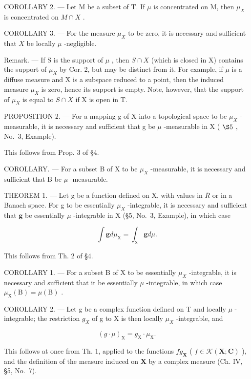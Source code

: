 COROLLARY 2. --- Let M be a subset of T. If \(\mu\) is concentrated on M, then \(\mu_{X}\) is concentrated on \(M \cap X\) .

COROLLARY 3. --- For the measure \(\mu_{X}\) to be zero, it is necessary and sufficient that \(X\) be locally \(\mu\) -negligible.

Remark. --- If S is the support of \(\mu\) , then \(S \cap X\) (which is closed in X) contains the support of \(\mu_{X}\) by Cor. 2, but may be distinct from it. For example, if \(\mu\) is a diffuse measure and X is a subspace reduced to a point, then the induced measure \(\mu_{X}\) is zero, hence its support is empty. Note, however, that the support of \(\mu_{X}\) is equal to \(S \cap X\) if X is open in T.

PROPOSITION 2. --- For a mapping g of X into a topological space to be \(\mu_{X}\) -measurable, it is necessary and sufficient that g be \(\mu\) -measurable in X ( \(\S5\) , No.~3, Example).

This follows from Prop. 3 of §4.

COROLLARY. --- For a subset B of X to be \(\mu_{X}\) -measurable, it is necessary and sufficient that B be \(\mu\) -measurable.

THEOREM 1. --- Let g be a function defined on X, with values in \(\overline{R}\) or in a Banach space. For g to be essentially \(\mu_{X}\) -integrable, it is necessary and sufficient that \(\mathbf{g}\) be essentially \(\mu\) -integrable in X (§5, No.~3, Example), in which case

\[
\int \mathbf {g} d \mu_ {\mathrm{X}} = \int_ {\mathrm{X}} \mathbf {g} d \mu .\tag{4}
\]

This follows from Th. 2 of §4.

COROLLARY 1. --- For a subset B of X to be essentially \(\mu_{X}\) -integrable, it is necessary and sufficient that it be essentially \(\mu\) -integrable, in which case \(\mu_{\mathrm{X}}(\mathrm{B}) = \mu(\mathrm{B})\) .

COROLLARY 2. --- Let g be a complex function defined on T and locally \(\mu\) -integrable; the restriction \(g_{X}\) of g to X is then locally \(\mu_{X}\) -integrable, and

\[
(g \cdot \mu) _ {\mathrm{X}} = g _ {\mathrm{X}} \cdot \mu_ {\mathrm{X}}.\tag{5}
\]

This follows at once from Th. 1, applied to the functions \(fg_{\mathbf{X}}\) ( \(f \in \mathcal{K}(\mathbf{X}; \mathbf{C})\) ), and the definition of the measure induced on \(\mathbf{X}\) by a complex measure (Ch. IV, §5, No.~7).

